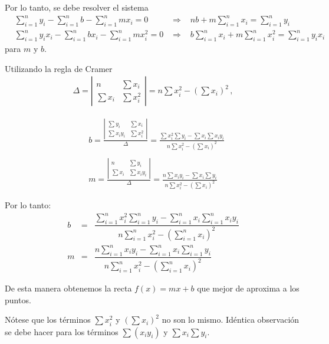 Por lo tanto, se debe resolver el sistema 
$$
\begin{aligned}
&  \sum_{i=1}^n y_i - \sum_{i=1}^nb - \sum_{i=1}^n m x_i = 0  &\,\, \Rightarrow \,\,&
 nb + m \sum_{i=1}^n  x_i = \sum_{i=1}^n y_i  \\
&  \sum_{i=1}^n y_ix_i - \sum_{i=1}^n bx_i -\sum_{i=1}^n  m x_i^2 =0 & \,\, \Rightarrow \,\,&
b \sum_{i=1}^n x_i  + m \sum_{i=1}^n   x_i^2 = \sum_{i=1}^n y_ix_i
\end{aligned}
$$
para $m$ y $b$. 

Utilizando la regla de Cramer
$$
\begin{aligned}
\Delta= 
{\left|\begin{array}{cc}
n & \sum x_i \\
\sum x_i & \sum x_i^2
\end{array}\right|} = n \sum x_i^2-\left(\sum x_i\right)^2 \,,
\end{aligned}
$$

$$
\begin{aligned}
& b=\frac{\left|\begin{array}{cc}
\sum y_i & \sum x_i \\
\sum x_i y_i & \sum x_i^2 
\end{array}\right|}{\Delta}=\frac{\sum x_i^2 \sum y_i-\sum x_i \sum x_i y_i}{n \sum x_i^2-\left(\sum x_i\right)^2} \\ \\
& m=\frac{\left|\begin{array}{cc}
n & \sum y_i \\
\sum x_i & \sum x_i y_i
\end{array}\right|}{\Delta}=\frac{n\sum x_i y_i-\sum x_i \sum y_i}{n \sum x_i^2-\left(\sum x_i\right)^2}
\end{aligned}
$$

Por lo tanto:
\begin{eqnarray}
b &=&\dfrac{\sum\limits_{i=1}^n x_i^2 \sum\limits_{i=1}^n y_i-\sum\limits_{i=1}^n x_i \sum\limits_{i=1}^n x_i y_i}{n\sum\limits_{i=1}^n x_i^2-\left(\sum\limits_{i=1}^n x_i\right)^2} 
\label{emeyb1}\\
m &=&\dfrac{ n\sum\limits_{i=1}^n x_i y_i-\sum\limits_{i=1}^n x_i \sum\limits_{i=1}^n y_i}{n \sum\limits_{i=1}^n x_i^2-\left(\sum\limits_{i=1}^n x_i\right)^2}
\label{emeyb2}
\end{eqnarray}

De esta manera obtenemos la recta $f(x)=mx+b$ que mejor de aproxima a los puntos. 

N\'otese que los t\'erminos $\sum x_i^2$ y $\left(\sum x_i\right)^2$ no son lo mismo. Id\'entica observaci\'on se debe hacer para los t\'erminos $\sum\left(x_i y_i\right)$ y $\sum x_i \sum y_i$.

